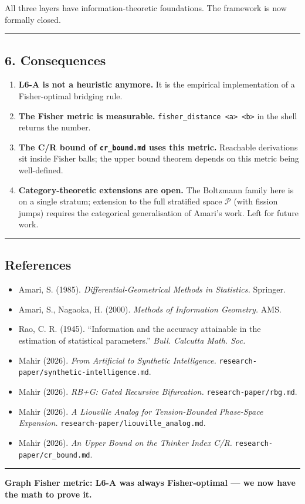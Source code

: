 \documentclass[
  11pt,
  a4paper,
]{article}
\providecommand{\tightlist}{%
  \setlength{\itemsep}{0pt}\setlength{\parskip}{0pt}}
\begin{document}
All three layers have information-theoretic foundations. The framework
is now formally closed.

\begin{center}\rule{0.5\linewidth}{0.5pt}\end{center}

\subsection{6. Consequences}\label{consequences}

\begin{enumerate}
\def\labelenumi{\arabic{enumi}.}
\tightlist
\item
  \textbf{L6-A is not a heuristic anymore.} It is the empirical
  implementation of a Fisher-optimal bridging rule.
\item
  \textbf{The Fisher metric is measurable.}
  \texttt{fisher\_distance\ \textless{}a\textgreater{}\ \textless{}b\textgreater{}}
  in the shell returns the number.
\item
  \textbf{The C/R bound of \texttt{cr\_bound.md} uses this metric.}
  Reachable derivations sit inside Fisher balls; the upper bound theorem
  depends on this metric being well-defined.
\item
  \textbf{Category-theoretic extensions are open.} The Boltzmann family
  here is on a single stratum; extension to the full stratified space
  \(\mathcal{P}\) (with fission jumps) requires the categorical
  generalisation of Amari's work. Left for future work.
\end{enumerate}

\begin{center}\rule{0.5\linewidth}{0.5pt}\end{center}

\subsection{References}\label{references}

\begin{itemize}
\tightlist
\item
  Amari, S. (1985). \emph{Differential-Geometrical Methods in
  Statistics.} Springer.
\item
  Amari, S., Nagaoka, H. (2000). \emph{Methods of Information Geometry.}
  AMS.
\item
  Rao, C. R. (1945). ``Information and the accuracy attainable in the
  estimation of statistical parameters.'' \emph{Bull. Calcutta Math.
  Soc.}
\item
  Mahir (2026). \emph{From Artificial to Synthetic Intelligence.}
  \texttt{research-paper/synthetic-intelligence.md}.
\item
  Mahir (2026). \emph{RB+G: Gated Recursive Bifurcation.}
  \texttt{research-paper/rbg.md}.
\item
  Mahir (2026). \emph{A Liouville Analog for Tension-Bounded Phase-Space
  Expansion.} \texttt{research-paper/liouville\_analog.md}.
\item
  Mahir (2026). \emph{An Upper Bound on the Thinker Index C/R.}
  \texttt{research-paper/cr\_bound.md}.
\end{itemize}

\begin{center}\rule{0.5\linewidth}{0.5pt}\end{center}

\textbf{Graph Fisher metric: L6-A was always Fisher-optimal --- we now
have the math to prove it.}
\end{document}
